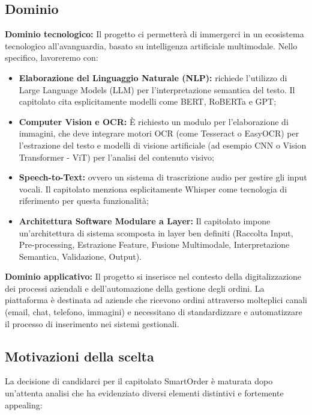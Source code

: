 \documentclass{article}
\begin{document}
	\subsection{Dominio}
	\textbf{Dominio tecnologico:} 
          Il progetto ci permetterà di immergerci in un ecosistema tecnologico all'avanguardia, basato su intelligenza artificiale multimodale. Nello specifico, lavoreremo con:
	\vspace{-0.3em}
	\begin{itemize}
	    \setlength\itemsep{-0.1em}
	    \item \textbf{Elaborazione del Linguaggio Naturale (NLP):} richiede l'utilizzo di Large Language Models (LLM) per l'interpretazione semantica del testo. Il capitolato cita esplicitamente modelli come BERT, RoBERTa e GPT;
	    \item \textbf{Computer Vision e OCR:} È richiesto un modulo per l'elaborazione di immagini, che deve integrare motori OCR (come Tesseract o EasyOCR) per l'estrazione del testo e modelli di visione artificiale (ad esempio CNN o Vision Transformer - ViT) per l'analisi del contenuto visivo;
	    \item \textbf{Speech-to-Text:} ovvero un sistema di trascrizione audio per gestire gli input vocali. Il capitolato menziona esplicitamente Whisper come tecnologia di riferimento per questa funzionalità;
	    \item \textbf{Architettura Software Modulare a Layer:} Il capitolato impone un'architettura di sistema scomposta in layer ben definiti (Raccolta Input, Pre-processing, Estrazione Feature, Fusione Multimodale, Interpretazione Semantica, Validazione, Output).
	\end{itemize}
    
    \vspace{1em}
    
	\textbf{Dominio applicativo:}
	Il progetto si inserisce nel contesto della digitalizzazione dei processi aziendali e dell'automazione della gestione degli ordini. La piattaforma è destinata ad aziende che ricevono ordini attraverso molteplici canali (email, chat, telefono, immagini) e necessitano di standardizzare e automatizzare il processo di inserimento nei sistemi gestionali.
	
	\subsection{Motivazioni della scelta}
	La decisione di candidarci per il capitolato SmartOrder è maturata dopo un'attenta analisi che ha evidenziato diversi elementi distintivi e fortemente appealing:
	
\end{document}
